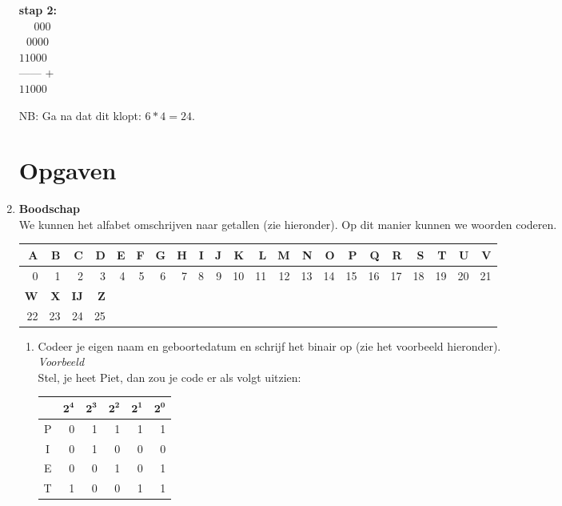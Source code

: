 \documentclass[10pt,a4paper,titlepage]{article}
\newcommand{\1}{\'{e}\'{e}n}
\begin{document}
\begin{enumerate}
\textbf{stap 2:}\\
$\textrm{ }\textrm{ }000$\\
$\textrm{ }0000$\\
$11000$\\
------ +\\
$11000$
 
NB: Ga na dat dit klopt: $6*4=24$.\\


\newpage
\section*{Opgaven}

\item \textbf{Boodschap}\\
We kunnen het alfabet omschrijven naar getallen (zie hieronder). Op dit manier kunnen we woorden coderen.

\begin{table}[h!]
\begin{tabular}{|r|r|r|r|r|r|r|r|r|r|r|r|r|r|r|r|r|r|r|r|r|r|}
\hline
\textbf{A}&\textbf{B}&\textbf{C}&\textbf{D}&\textbf{E}&\textbf{F}&\textbf{G}&\textbf{H}&\textbf{I}&\textbf{J}&\textbf{K} &\textbf{L} &\textbf{M}&\textbf{N}&\textbf{O}&\textbf{P}&\textbf{Q}&\textbf{R}&\textbf{S}&\textbf{T}&\textbf{U}&\textbf{V}\\ \hline
0&1&2&3&4&5&6&7&8&9&10&11&12&13&14&15&16&17&18&19&20&21\\ \hline\hline
\textbf{W}& \textbf{X}&\textbf{IJ}&\textbf{Z}\\ \cline{1-4}
22&23&24&25\\ \cline{1-4}
\end{tabular}
\end{table}

\begin{enumerate}
\item{Codeer je eigen naam en geboortedatum en schrijf het binair op (zie het voorbeeld hieronder).\\
\textit{Voorbeeld}\\
Stel, je heet Piet, dan zou je code er als volgt uitzien:}

\begin{table}[h!]
\begin{tabular}{c|rrrrr}
    & $\mathbf{2^4}$&$\mathbf{2^3}$ & $\mathbf{2^2}$    & $\mathbf{2^1}$    & $\mathbf{2^0}$\\ \hline
P   &0              & 1             & 1             & 1             & 1\\
I   & 0             & 1             & 0             & 0             & 0\\
E   & 0             & 0             & 1             & 0             & 1\\
T   & 1             & 0             & 0             & 1             & 1\\
\end{tabular}
\end{table}


\end{enumerate}
\end{enumerate}
\end{document}
